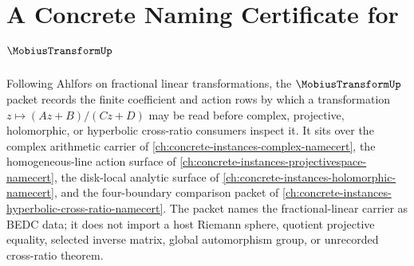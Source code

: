 \chapter{A Concrete Naming Certificate for $\MobiusTransformUp$}
\label{ch:concrete-instances-mobius-transform-namecert}

Following Ahlfors on fractional linear transformations, the $\MobiusTransformUp$ packet records the finite coefficient and action rows by which a transformation $z \mapsto (Az+B)/(Cz+D)$ may be read before complex, projective, holomorphic, or hyperbolic cross-ratio consumers inspect it. It sits over the complex arithmetic carrier of \autoref{ch:concrete-instances-complex-namecert}, the homogeneous-line action surface of \autoref{ch:concrete-instances-projectivespace-namecert}, the disk-local analytic surface of \autoref{ch:concrete-instances-holomorphic-namecert}, and the four-boundary comparison packet of \autoref{ch:concrete-instances-hyperbolic-cross-ratio-namecert}. The packet names the fractional-linear carrier as BEDC data; it does not import a host Riemann sphere, quotient projective equality, selected inverse matrix, global automorphism group, or unrecorded cross-ratio theorem.

